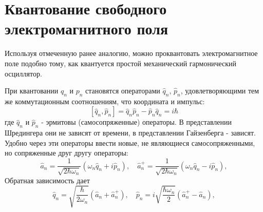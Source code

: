 \section{Квантование свободного электромагнитного поля}
\label{Ch1_quantumemf}
Используя отмеченную ранее аналогию, можно проквантовать
электромагнитное поле подобно тому, как квантуется простой
механический гармонический осциллятор. 

При квантовании $q_n$ и $p_n$ становятся операторами $\hat{q}_n$,
$\hat{p}_n$, удовлетворяющими тем же коммутационным соотношениям, 
что координата и импульс: 
\begin{equation}
\left[\hat{q}_n, \hat{p}_n\right] = \hat{q}_n\hat{p}_n -
\hat{p}_n \hat{q}_n = i\hbar
\label{eqCh1_comut}
\end{equation}
где $\hat{q}_n$ и $\hat{p}_n$ - эрмитовы (самосопряженные)
операторы. В представлении Шредингера они не зависят от
времени, в представлении Гайзенберга - зависят. Удобно через
эти операторы ввести новые, не являющиеся самосопряженными, но
сопряженные друг другу операторы: 
\begin{equation}
\hat{a}_n = \frac{1}{\sqrt{2 \hbar \omega_n}}
\left( \omega_n \hat{q}_n + i \hat{p}_n\right),
\quad
\hat{a}_n^{+} = \frac{1}{\sqrt{2 \hbar \omega_n}}
\left( \omega_n \hat{q}_n - i \hat{p}_n\right),
\label{eqCh1_aadef}
\end{equation}
Обратная зависимость дает
\begin{equation}
\hat{q}_n = \sqrt{\frac{\hbar}{2 \omega_n}}
\left(\hat{a}_n + \hat{a}_n^{+}\right),
\quad
\hat{p}_n = i \sqrt{\frac{\hbar \omega_n}{2}}
\left(\hat{a}_n^{+} - \hat{a}_n\right),
\label{eqCh1_qpdef}
\end{equation}

